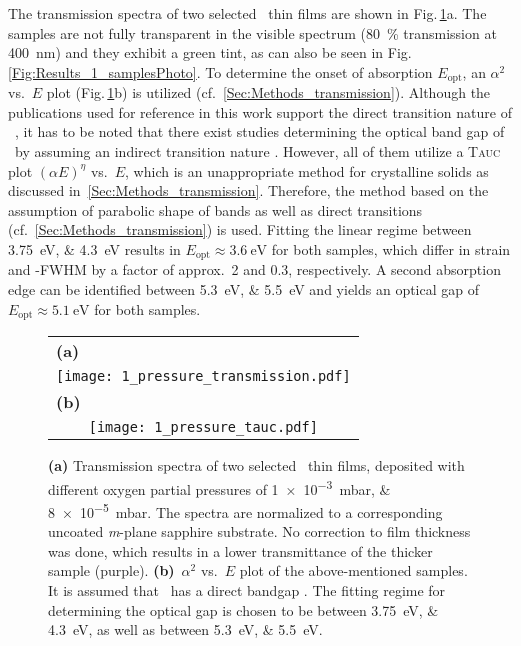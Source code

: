 The transmission spectra of two selected \cro\ thin films are shown in Fig.\,\ref{Fig:Results_1_transmission}a.
The samples are not fully transparent in the visible spectrum (\qty{80}{\percent} transmission at \qty{400}{\nm}) and they exhibit a green tint, as can also be seen in Fig.\,\ref{Fig:Results_1_samplesPhoto}.
To determine the onset of absorption $E_\mathrm{opt}$, an $\alpha^2$ vs.\ $E$ plot (Fig.\,\ref{Fig:Results_1_transmission}b) is utilized (cf.~\ref{Sec:Methods_transmission}).
Although the publications used for reference in this work support the direct transition nature of \cro\ 
    \cite{farrell2015,mi2018},
it has to be noted that there exist studies determining the optical band gap of \cro\ by assuming an indirect transition nature 
    \cite{cheng1996,al-kuhaili2007}.
However, all of them utilize a \textsc{Tauc} plot $(\alpha E)^\eta$ vs.\ $E$, which is an unappropriate method for crystalline solids as discussed in~\ref{Sec:Methods_transmission}.
Therefore, the method based on the assumption of parabolic shape of bands as well as direct transitions (cf.\ \ref{Sec:Methods_transmission}) is used.
Fitting the linear regime between \qtylist{3.75;4.3}{\eV} results in $E_\mathrm{opt}\approx\qty{3.6}{\eV}$ for both samples, which differ in strain and \textomega-FWHM by a factor of approx.\ 2 and 0.3, respectively.
A second absorption edge can be identified between \qtylist{5.3;5.5}{\eV} and yields an optical gap of $E_\mathrm{opt}\approx\qty{5.1}{\eV}$ for both samples.
\begin{figure}
    \centering
    \begin{tabular}{c}
        \multicolumn{1}{l}{\textbf{(a)}}\figSpace\\
        \texttt{[image: 1\_pressure\_transmission.pdf]}\figSpace\\
        \multicolumn{1}{l}{\textbf{(b)}}\figSpace\\
        \texttt{[image: 1\_pressure\_tauc.pdf]}
    \end{tabular}
    \caption{\textbf{(a)} Transmission spectra of two selected \cro\ thin films, deposited with different oxygen partial pressures of \qtylist{1e-3;8e-5}{\milli\bar}.
    The spectra are normalized to a corresponding uncoated \textit{m}-plane sapphire substrate.
    No correction to film thickness was done, which results in a lower transmittance of the thicker sample (purple).
    \textbf{(b)}~$\alpha^2$ vs.\ $E$ plot of the above-mentioned samples.
    It is assumed that \cro\ has a direct bandgap
        \cite{farrell2015,mi2018}.
    The fitting regime for determining the optical gap is chosen to be between \qtylist{3.75;4.3}{\eV}, as well as between \qtylist{5.3;5.5}{\eV}.
    }
    \label{Fig:Results_1_transmission}
\end{figure}